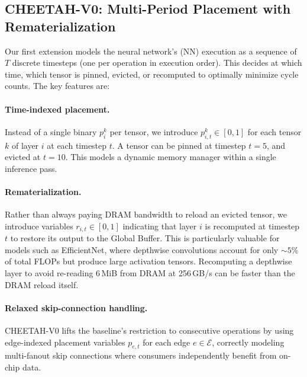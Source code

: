 \subsection{CHEETAH-V0: Multi-Period Placement with Rematerialization}
\label{sec:v0}

Our first extension models the neural network's (NN) execution as a sequence of $T$ discrete timesteps (one per operation in execution order). This decides at which time, which tensor is pinned, evicted, or recomputed to optimally minimize cycle counts. The key features are:

\paragraph{Time-indexed placement.}
Instead of a single binary $p_i^k$ per tensor, we introduce $p_{i,t}^k \in [0,1]$ for each tensor $k$ of layer $i$ at each timestep $t$. A tensor can be pinned at timestep $t=5$, and evicted at $t=10$. This models a dynamic memory manager within a single inference pass.

\paragraph{Rematerialization.}
Rather than always paying DRAM bandwidth to reload an evicted tensor, we introduce variables $r_{i,t} \in [0,1]$ indicating that layer $i$ is recomputed at timestep $t$ to restore its output to the Global Buffer. This is particularly valuable for models such as EfficientNet, where depthwise convolutions account for only ${\sim}5\%$ of total FLOPs but produce large activation tensors. Recomputing a depthwise layer to avoid re-reading 6\,MiB from DRAM at 256\,GB/s can be faster than the DRAM reload itself.

\paragraph{Relaxed skip-connection handling.}
CHEETAH-V0 lifts the baseline's restriction to consecutive operations by using edge-indexed placement variables $p_{e,t}$ for each edge $e \in \mathcal{E}$, correctly modeling multi-fanout skip connections where consumers independently benefit from on-chip data.

